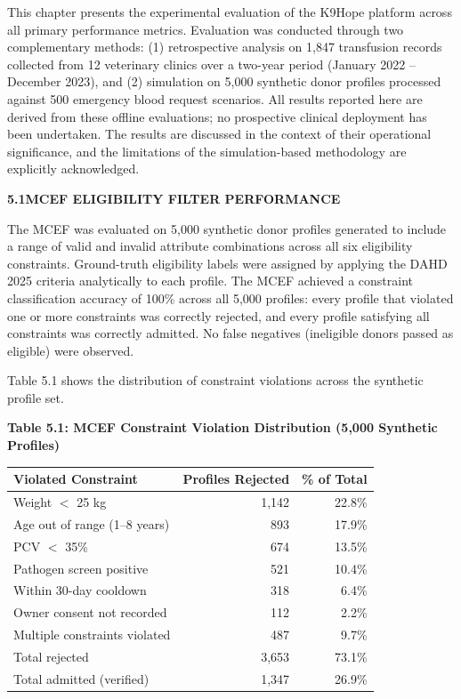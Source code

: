 \documentclass[12pt,a4paper]{article}
\begin{document}
\noindent This chapter presents the experimental evaluation of the K9Hope platform across all primary performance metrics. Evaluation was conducted through two complementary methods: (1) retrospective analysis on 1,847 transfusion records collected from 12 veterinary clinics over a two-year period (January 2022 -- December 2023), and (2) simulation on 5,000 synthetic donor profiles processed against 500 emergency blood request scenarios. All results reported here are derived from these offline evaluations; no prospective clinical deployment has been undertaken. The results are discussed in the context of their operational significance, and the limitations of the simulation-based methodology are explicitly acknowledged.

\vspace{1.5em}
\noindent\textbf{5.1\quad MCEF ELIGIBILITY FILTER PERFORMANCE}
\vspace{0.6em}

\noindent The MCEF was evaluated on 5,000 synthetic donor profiles generated to include a range of valid and invalid attribute combinations across all six eligibility constraints. Ground-truth eligibility labels were assigned by applying the DAHD 2025 criteria analytically to each profile. The MCEF achieved a constraint classification accuracy of 100\% across all 5,000 profiles: every profile that violated one or more constraints was correctly rejected, and every profile satisfying all constraints was correctly admitted. No false negatives (ineligible donors passed as eligible) were observed.

\noindent Table 5.1 shows the distribution of constraint violations across the synthetic profile set.

\begin{center}
\textbf{Table 5.1: MCEF Constraint Violation Distribution (5,000 Synthetic Profiles)}
\vspace{0.4em}
\begin{tabular}{lrr}
\toprule
\textbf{Violated Constraint} & \textbf{Profiles Rejected} & \textbf{\% of Total} \\
\midrule
Weight $<$ 25 kg & 1,142 & 22.8\% \\
Age out of range (1--8 years) & 893 & 17.9\% \\
PCV $<$ 35\% & 674 & 13.5\% \\
Pathogen screen positive & 521 & 10.4\% \\
Within 30-day cooldown & 318 & 6.4\% \\
Owner consent not recorded & 112 & 2.2\% \\
Multiple constraints violated & 487 & 9.7\% \\
\midrule
Total rejected & 3,653 & 73.1\% \\
Total admitted (verified) & 1,347 & 26.9\% \\
\bottomrule
\end{tabular}
\end{center}
\end{document}
